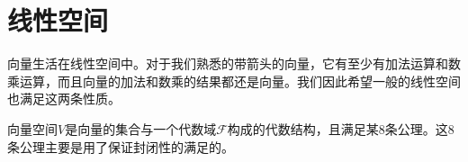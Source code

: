 \documentclass[a4paper,11pt]{ctexart}
\newcommand{\field}{\mathscr{F}}
\begin{document}
\section{线性空间}

向量生活在线性空间中。对于我们熟悉的带箭头的向量，它有至少有加法运算和数乘运算，而且向量的加法和数乘的结果都还是向量。我们因此希望一般的线性空间也满足这两条性质。\par
向量空间$V$是向量的集合与一个代数域$\field$构成的代数结构，且满足某8条公理。这8条公理主要是用了保证封闭性的满足的。
\end{document}
